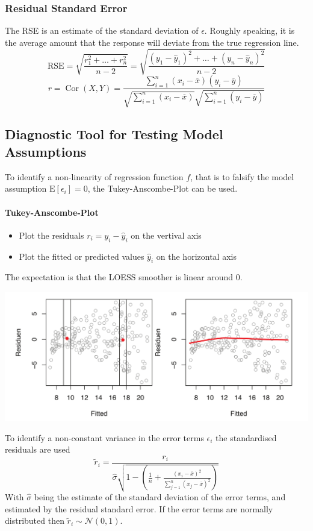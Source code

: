 \documentclass[11pt]{article}
\newcommand*\samplemean[1]{\overline{#1}}
\newcommand*\ev[1]{\mathrel{\text{E}\left[#1\right]}}
\newcommand*\N[1]{\mathcal{N}\left(#1\right)}
\newcommand*\Cor[1]{\mathop{\text{Cor}}\left(#1\right)}
\begin{document}
\subsubsection{Residual Standard Error}
The RSE is an estimate of the standard deviation of $\epsilon$. Roughly speaking, it is the average amount that the response will deviate from the true regression line.
\begin{equation*}
	\text{RSE} = \sqrt{\frac{r_1^2 + \dots + r_n^2}{n-2}} = \sqrt{\frac{(y_1 - \hat{y}_1)^2 + \dots + (y_n - \hat{y}_n)^2}{n-2}}
\end{equation*}
\begin{equation*}
	r = \Cor{X,Y} = \frac{\sum_{i=1}^{n}(x_i - \samplemean{x})(y_i - \samplemean{y})}{\sqrt{\sum_{i=1}^{n} (x_i - \samplemean{x})}\sqrt{\sum_{i=1}^{n} (y_i - \samplemean{y})}}
\end{equation*}

\subsection{Diagnostic Tool for Testing Model Assumptions}
To identify a non-linearity of regression function $f$, that is to falsify the model assumption $\ev{\epsilon_i} = 0$, the Tukey-Anscombe-Plot can be used.\\
\paragraph{Tukey-Anscombe-Plot}
\begin{itemize}
	\item Plot the residuals $r_i = y_i - \hat{y}_i$ on the vertival axis
	\item Plot the fitted or predicted values $\hat{y}_i$ on the horizontal axis
\end{itemize}
The expectation is that the LOESS smoother is linear around 0.
\begin{center}
	\includegraphics[width=0.8\linewidth]{img/LOESS_smoother}
\end{center}
To identify a non-constant variance in the error terms $\epsilon_i$ the standardised residuals are used
\begin{equation*}
	\tilde{r}_i = \frac{r_i}{\hat{\sigma}\sqrt{1 - \left( \frac{1}{n} + \frac{(x_i - \samplemean{x})^2}{\sum_{j=1}^{n}(x_j - \samplemean{x})^2} \right)}}
\end{equation*}
With $\hat{\sigma}$ being the estimate of the standard deviation of the error terms, and estimated by the residual standard error. If the error terms are normally distributed then $\tilde{r}_i \sim \N{0,1}$.
\end{document}

